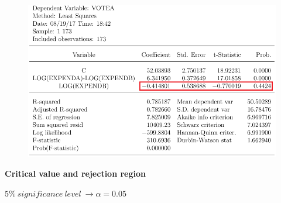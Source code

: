 \documentclass[12pt]{report}
\begin{document}
\begin{figure}[H]
	\centering
	\includegraphics{q1_27}
\end{figure}
\vspace{-\baselineskip}

\noindent \textbf{Critical value and rejection region}

\noindent $5\%\ significance\ level\ \to \alpha = 0.05$
\end{document}
